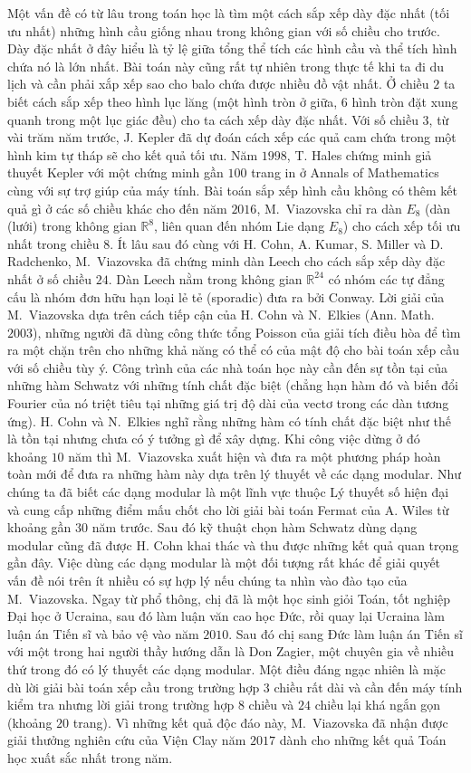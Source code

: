 \begin{multicols}{2}
	Một vấn đề có từ lâu trong toán học là tìm một cách sắp xếp dày đặc nhất (tối ưu nhất) những hình cầu giống nhau trong không gian với số chiều cho trước. Dày đặc nhất ở đây hiểu là tỷ lệ giữa tổng thể tích các hình cầu và thể tích hình chứa nó là lớn nhất. Bài toán này cũng rất tự nhiên trong thực tế khi ta đi du lịch và cần phải xắp xếp sao cho balo chứa được nhiều đồ vật nhất. Ở chiều $2$ ta biết cách sắp xếp theo hình lục lăng (một hình tròn ở giữa, $6$ hình tròn đặt xung quanh trong một lục giác đều) cho ta cách xếp dày đặc nhất. Với số chiều $3$, từ vài trăm năm trước, J. Kepler đã dự đoán cách xếp các quả cam chứa trong một hình kim tự tháp sẽ cho kết quả tối ưu. Năm $1998$, T. Hales chứng minh giả thuyết Kepler với một chứng minh gần $100$ trang in ở Annals of Mathematics cùng với sự trợ giúp của máy tính. Bài toán sắp xếp hình cầu không có thêm kết quả gì ở các số chiều khác cho đến năm $2016$, M.~Viazovska chỉ ra dàn $E_{8}$ (dàn (lưới) trong không gian $\mathbb{R}^8$, liên quan đến nhóm Lie dạng $E_{8}$) cho cách xếp tối ưu nhất trong chiều $8$. Ít lâu sau đó cùng với H. Cohn, A. Kumar, S. Miller và D. Radchenko, M.~Viazovska đã chứng minh dàn Leech cho cách sắp xếp dày đặc nhất ở số chiều $24$. Dàn Leech nằm trong không gian $\mathbb{R}^{24}$ có nhóm các tự đẳng cấu là nhóm đơn hữu hạn loại lẻ tẻ (sporadic) đưa ra bởi Conway. Lời giải của M.~Viazovska dựa trên cách tiếp cận của H. Cohn và N.~Elkies (Ann. Math. $2003$), những người đã dùng công thức tổng Poisson của giải tích điều hòa để tìm ra một chặn trên cho những khả năng có thể có của mật độ cho bài toán xếp cầu với số chiều tùy ý. Công trình của các nhà toán học này cần đến sự tồn tại của những hàm Schwatz với những tính chất đặc biệt (chẳng hạn hàm đó và biến đổi Fourier của nó triệt tiêu tại những giá trị độ dài của vectơ trong các dàn tương ứng). H. Cohn và N.~Elkies nghĩ rằng những hàm có tính chất đặc biệt như thế là tồn tại nhưng chưa có ý tưởng gì để xây dựng. Khi công việc dừng ở đó khoảng $10$ năm thì M.~Viazovska xuất hiện và đưa ra một phương pháp hoàn toàn mới để đưa ra những hàm này dựa trên lý thuyết về các dạng modular. Như chúng ta đã biết các dạng modular là một lĩnh vực thuộc Lý thuyết số hiện đại và cung cấp những điểm mấu chốt cho lời giải bài toán Fermat của A. Wiles từ khoảng gần $30$ năm trước. Sau đó kỹ thuật chọn hàm Schwatz dùng dạng modular cũng đã được H. Cohn khai thác và thu được những kết quả quan trọng gần đây. Việc dùng các dạng modular là một đối tượng rất khác để giải quyết vấn đề nói trên ít nhiều có sự hợp lý nếu chúng ta nhìn vào đào tạo của M.~Viazovska. Ngay từ phổ thông, chị đã là một học sinh giỏi Toán, tốt nghiệp Đại học ở Ucraina, sau đó làm luận văn cao học Đức, rồi quay lại Ucraina làm luận án Tiến sĩ và bảo vệ vào năm $2010$. Sau đó chị sang Đức làm luận án Tiến sĩ với một trong hai người thầy hướng dẫn là Don Zagier, một chuyên gia về nhiều thứ trong đó có lý thuyết các dạng modular. Một điều đáng ngạc nhiên là mặc dù lời giải bài toán xếp cầu trong trường hợp $3$ chiều rất dài và cần đến máy tính kiểm tra nhưng lời giải trong trường hợp $8$ chiều và $24$ chiều lại khá ngắn gọn (khoảng $20$ trang). Vì những kết quả độc đáo này, M.~Viazovska đã nhận được giải thưởng nghiên cứu của Viện Clay năm $2017$ dành cho những kết quả Toán học xuất sắc nhất trong năm.        

\end{multicols}

